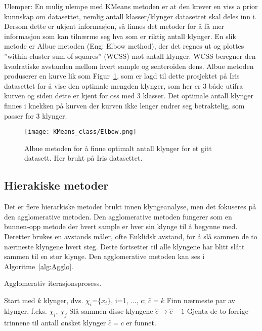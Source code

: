 \documentclass[twocolumn,norwegian]{article}
\begin{document}
	Ulemper: En mulig ulempe med KMeans metoden er at den krever en viss a prior kunnskap om datasettet, nemlig antall klasser/klynger datasettet skal deles inn i. Dersom dette er ukjent informasjon, så finnes det metoder for å få mer informasjon som kan tilnærme seg hva som er riktig antall klynger. En slik metode er Albue metoden (Eng: Elbow method), der det regnes ut og plottes ''within-cluster sum of squares'' (WCSS) mot antall klynger. WCSS beregner den kvadratiske avstanden mellom hvert sample og senteroiden dens. Albue metoden produserer en kurve lik som Figur~\ref{fig:Elbow}, som er lagd til dette prosjektet på Iris datasettet for å vise den optimale mengden klynger, som her er 3 både utifra kurven og siden dette er kjent for oss med 3 klasser. Det optimale antall klynger finnes i knekken på kurven der kurven ikke lenger endrer seg betraktelig, som passer for 3 klynger.
	\begin{figure}[ht!]
		\centering
		\texttt{[image: KMeans\_class/Elbow.png]}
		\caption{Albue metoden for å finne optimalt antall klynger for et gitt datasett. Her brukt på Iris datasettet.}
		\label{fig:Elbow}
	\end{figure}
	
	
	\subsection{Hierakiske metoder}
	Det er flere hierarkiske metoder brukt innen klyngeanalyse, men det fokuseres på den agglomerative metoden. Den agglomerative metoden fungerer som en bunnen-opp metode der hvert sample er hver sin klynge til å begynne med. Deretter brukes en avstands måler, ofte Euklidsk avstand, for å slå sammen de to nærmeste klyngene hvert steg. Dette fortsetter til alle klyngene har blitt slått sammen til en stor klynge. Den agglomerative metoden kan ses i Algoritme~\ref{alg:Agglo}.
	\begin{algorithm}
		\caption{Agglomerativ iterasjonsprosess.}
		\label{alg:Agglo}
		\begin{algorithmic}
			\STATE *Start med $k$ klynger, dvs. $\chi_i$=$\{x_i\}$, i=1, ..., c; $\hat{c}=k$
			\STATE *Finn nærmeste par av klynger, f.eks. $\chi_i$, $\chi_j$
			\STATE *Slå sammen disse klyngene $\hat{c}\rightarrow \hat{c}-1$ 
			\STATE *Gjenta de to forrige trinnene til antall ønsket klynger $\hat{c}=c$ er funnet.
		\end{algorithmic}
	\end{algorithm}
	
\end{document}
